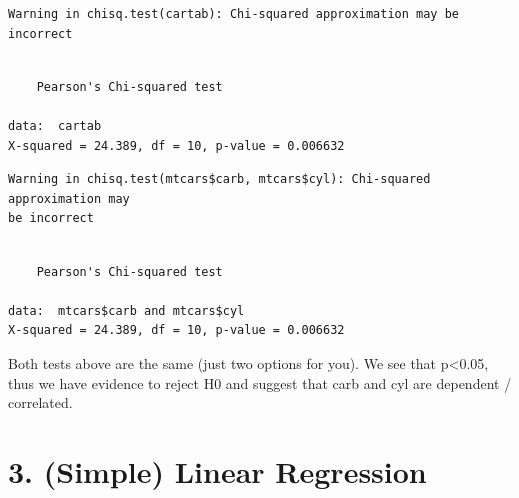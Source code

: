 \documentclass[
  letterpaper,
  DIV=11,
  numbers=noendperiod]{scrartcl}
\newenvironment{Shaded}{\begin{snugshade}}{\end{snugshade}}
\newcommand{\CommentTok}[1]{\textcolor[rgb]{0.37,0.37,0.37}{#1}}
\newcommand{\FunctionTok}[1]{\textcolor[rgb]{0.28,0.35,0.67}{#1}}
\newcommand{\NormalTok}[1]{\textcolor[rgb]{0.00,0.23,0.31}{#1}}
\newcommand{\OtherTok}[1]{\textcolor[rgb]{0.00,0.23,0.31}{#1}}
\newcommand{\SpecialCharTok}[1]{\textcolor[rgb]{0.37,0.37,0.37}{#1}}
\begin{document}
\begin{Shaded}
\end{Shaded}

\begin{verbatim}
Warning in chisq.test(cartab): Chi-squared approximation may be incorrect
\end{verbatim}

\begin{verbatim}

    Pearson's Chi-squared test

data:  cartab
X-squared = 24.389, df = 10, p-value = 0.006632
\end{verbatim}

\begin{Shaded}
\end{Shaded}

\begin{verbatim}
Warning in chisq.test(mtcars$carb, mtcars$cyl): Chi-squared approximation may
be incorrect
\end{verbatim}

\begin{verbatim}

    Pearson's Chi-squared test

data:  mtcars$carb and mtcars$cyl
X-squared = 24.389, df = 10, p-value = 0.006632
\end{verbatim}

Both tests above are the same (just two options for you). We see that
p\textless0.05, thus we have evidence to reject H0 and suggest that carb
and cyl are dependent / correlated.

\hypertarget{simple-linear-regression}{%
\section{\texorpdfstring{\textbf{3. (Simple) Linear
Regression}}{3. (Simple) Linear Regression}}\label{simple-linear-regression}}
\end{document}
